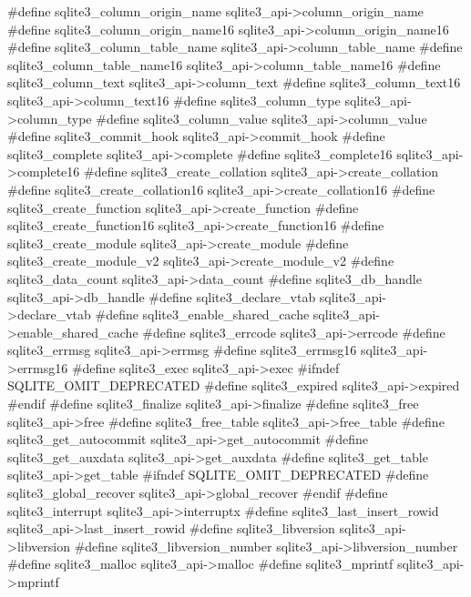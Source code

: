 \begin{Codex}[label=sqlite3ext.h,numbers=left]
#define sqlite3_column_origin_name     sqlite3_api->column_origin_name
#define sqlite3_column_origin_name16   sqlite3_api->column_origin_name16
#define sqlite3_column_table_name      sqlite3_api->column_table_name
#define sqlite3_column_table_name16    sqlite3_api->column_table_name16
#define sqlite3_column_text            sqlite3_api->column_text
#define sqlite3_column_text16          sqlite3_api->column_text16
#define sqlite3_column_type            sqlite3_api->column_type
#define sqlite3_column_value           sqlite3_api->column_value
#define sqlite3_commit_hook            sqlite3_api->commit_hook
#define sqlite3_complete               sqlite3_api->complete
#define sqlite3_complete16             sqlite3_api->complete16
#define sqlite3_create_collation       sqlite3_api->create_collation
#define sqlite3_create_collation16     sqlite3_api->create_collation16
#define sqlite3_create_function        sqlite3_api->create_function
#define sqlite3_create_function16      sqlite3_api->create_function16
#define sqlite3_create_module          sqlite3_api->create_module
#define sqlite3_create_module_v2       sqlite3_api->create_module_v2
#define sqlite3_data_count             sqlite3_api->data_count
#define sqlite3_db_handle              sqlite3_api->db_handle
#define sqlite3_declare_vtab           sqlite3_api->declare_vtab
#define sqlite3_enable_shared_cache    sqlite3_api->enable_shared_cache
#define sqlite3_errcode                sqlite3_api->errcode
#define sqlite3_errmsg                 sqlite3_api->errmsg
#define sqlite3_errmsg16               sqlite3_api->errmsg16
#define sqlite3_exec                   sqlite3_api->exec
#ifndef SQLITE_OMIT_DEPRECATED
#define sqlite3_expired                sqlite3_api->expired
#endif
#define sqlite3_finalize               sqlite3_api->finalize
#define sqlite3_free                   sqlite3_api->free
#define sqlite3_free_table             sqlite3_api->free_table
#define sqlite3_get_autocommit         sqlite3_api->get_autocommit
#define sqlite3_get_auxdata            sqlite3_api->get_auxdata
#define sqlite3_get_table              sqlite3_api->get_table
#ifndef SQLITE_OMIT_DEPRECATED
#define sqlite3_global_recover         sqlite3_api->global_recover
#endif
#define sqlite3_interrupt              sqlite3_api->interruptx
#define sqlite3_last_insert_rowid      sqlite3_api->last_insert_rowid
#define sqlite3_libversion             sqlite3_api->libversion
#define sqlite3_libversion_number      sqlite3_api->libversion_number
#define sqlite3_malloc                 sqlite3_api->malloc
#define sqlite3_mprintf                sqlite3_api->mprintf

\end{Codex}
